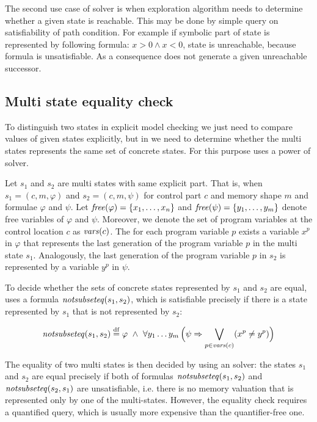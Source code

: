The second use case of \SMT solver is when exploration algorithm needs to
determine whether a given state is reachable. This may be done by simple query
on satisfiability of path condition. For example if symbolic part of state is
represented by following formula: $x > 0 \wedge x < 0$, state is unreachable,
because formula is unsatisfiable. As a consequence \SymDIVINE does
not generate a given unreachable successor.

\subsection{Multi state equality check}

To distinguish two states in explicit model checking we just need to compare values of
given states explicitly, but in \SymDIVINE we need to determine whether the
multi states represents the same set of concrete states. For this purpose \SymDIVINE
uses a power of \SMT solver.

Let $s_1$ and $s_2$ are multi states with same explicit part. That is, when $s_1
= (c, m, \varphi)$ and $s_2 = (c, m, \psi)$ for control part $c$ and
memory shape $m$ and formulae $\varphi$ and $\psi$. Let $\mathit{free}(\varphi) = \{x_1,
\dots, x_n\}$ and
$\mathit{free}(\psi) = \{ y_1, \dots, y_m\}$ denote free variables of $\varphi$ and
$\psi$. Moreover, we denote the set of program variables at the control location
$c$ as $\mathit{vars}(c)$. The for each program variable $p$ exists a variable $x^p$ in
$\varphi$ that represents the last generation of the program  variable $p$ in
the multi state $s_1$. Analogously, the last generation of the program variable
$p$ in $s_2$ is represented by a variable $y^p$ in $\psi$.

To decide whether the sets of concrete states represented by $s_1$ and $s_2$ are
equal, \SymDIVINE uses a formula $\mathit{notsubseteq}(s_1, s_2)$, which is satisfiable
precisely if there is a state represented by $s_1$ that is not represented by
$s_2$:

\[
  \mathit{notsubseteq}(s_1, s_2) \stackrel{\mathrm{df}}{=} \varphi~\land~ \forall y_1 \ldots y_m
  \, \Big ( \psi \Rightarrow \bigvee_{p \in \mathit{vars}(c)} (x^p \not =
  y^p) \Big)
\]

The equality of two multi states is then decided by using an \SMT solver:
the states $s_1$ and $s_2$ are equal precisely if both of
formulas $\mathit{notsubseteq}(s_1, s_2)$ and $\mathit{notsubseteq}(s_2, s_1)$ are
unsatisfiable, i.e. there is no memory valuation that is represented
only by one of the multi-states. However, the equality check requires
a quantified \SMT query, which is usually more expensive than the
quantifier-free one.

